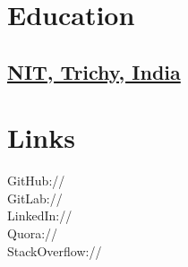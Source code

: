 \documentclass[]{deedy-resume-openfont}
\begin{document}
%
%
\lastupdated

%
%



%
%

\begin{minipage}[t]{0.33\textwidth}


\section{Education}

\subsection {\href{http://www.nitt.edu/}{NIT, Trichy, India}}


\section{Links}
GitHub:// \href{https://github.com/tushar-rishav}{} \\
GitLab:// \href{https://gitlab.com/tushar-rishav}{} \\
LinkedIn://  \href{https://www.linkedin.com/in/tusharrishav}{} \\
Quora:// \href{https://www.quora.com/profile/Tushar-50}{} \\
StackOverflow:// \href{http://stackoverflow.com/users/3673031/tushar-gautam}{}
\sectionsep



\end{minipage}
\end{document}
